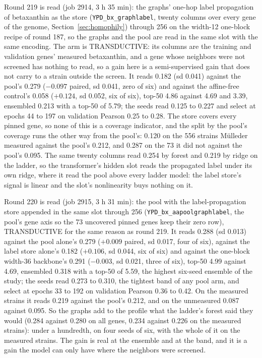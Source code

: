 Round 219 is read (job 2914, 3 h 35 min): the graphs' one-hop label propagation of
betaxanthin as the store (\texttt{YPD\_bx\_graphlabel}, twenty columns over every gene
of the genome, Section~\ref{sec:homophily}) through 256 on the width-12 one-block
recipe of round 187, so the graphs and the pool are read in the same slot with the same
encoding. The arm is TRANSDUCTIVE: its columns are the training and validation genes'
measured betaxanthin, and a gene whose neighbors were not screened has nothing to
read, so a gain here is a semi-supervised gain that does not carry to a strain outside
the screen. It reads 0.182 (sd 0.041) against the pool's 0.279 ($-0.097$ paired, sd
0.041, zero of six) and against the affine-free control's 0.058 ($+0.124$, sd 0.052,
six of six), top-50 4.86 against 4.69 and 3.39, ensembled 0.213 with a top-50 of 5.79;
the seeds read 0.125 to 0.227 and select at epochs 44 to 197 on validation Pearson 0.25
to 0.28. The store covers every pinned gene, so none of this is a coverage indicator,
and the split by the pool's coverage runs the other way from the pool's: 0.120 on the
556 strains M\"ulleder measured against the pool's 0.212, and 0.287 on the 73 it did
not against the pool's 0.095. The same twenty columns read 0.254 by forest and 0.219
by ridge on the ladder, so the transformer's hidden slot reads the propagated label
under its own ridge, where it read the pool above every ladder model: the label store's
signal is linear and the slot's nonlinearity buys nothing on it.

Round 220 is read (job 2915, 3 h 31 min): the pool with the label-propagation store
appended in the same slot through 256 (\texttt{YPD\_bx\_aapoolgraphlabel}, the pool's
gene axis so the 73 uncovered pinned genes keep their zero row), TRANSDUCTIVE for the
same reason as round 219. It reads 0.288 (sd 0.013) against the pool alone's 0.279
($+0.009$ paired, sd 0.017, four of six), against the label store alone's 0.182
($+0.106$, sd 0.044, six of six) and against the one-block width-36 backbone's 0.291
($-0.003$, sd 0.021, three of six), top-50 4.99 against 4.69, ensembled 0.318 with a
top-50 of 5.59, the highest six-seed ensemble of the study; the seeds read 0.273 to
0.310, the tightest band of any pool arm, and select at epochs 33 to 192 on validation
Pearson 0.36 to 0.42. On the measured strains it reads 0.219 against the pool's 0.212,
and on the unmeasured 0.087 against 0.095. So the graphs add to the profile what the
ladder's forest said they would (0.284 against 0.280 on all genes, 0.234 against 0.226
on the measured strains): under a hundredth, on four seeds of six, with the whole of it
on the measured strains. The gain is real at the ensemble and at the band, and it is a
gain the model can only have where the neighbors were screened.

